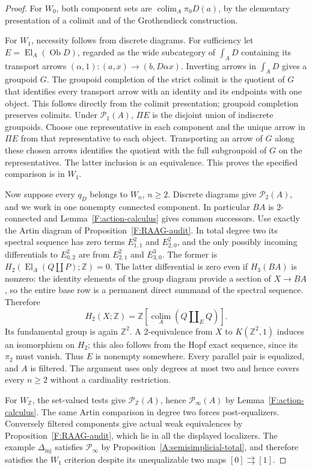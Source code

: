 \documentclass[11pt,a4paper]{article}
\theoremstyle{definition}
\theoremstyle{remark}
\newcommand{\El}{\operatorname{El}}
\newcommand{\colim}{\operatorname*{colim}}
\begin{document}
\begin{proof}
For $W_0$, both component sets are
$\colim_A\pi_0D(a)$, by the elementary presentation of a colimit
and of the Grothendieck construction.

For $W_1$, necessity follows from discrete diagrams.  For sufficiency
let $E=\El_A(\operatorname{Ob}D)$, regarded as the wide subcategory
of $\int_A D$ containing its transport arrows
$(\alpha,1): (a,x)\to(b,D\alpha x)$.
Inverting arrows in $\int_A D$ gives a groupoid $G$.
The groupoid completion of the strict colimit is the quotient of
$G$ that identifies every transport arrow with an identity and its
endpoints with one object.  This follows directly from the colimit
presentation; groupoid completion preserves colimits.
Under $\mathcal P_1(A)$, $\Pi E$ is the disjoint union of
indiscrete groupoids.  Choose one representative in each component
and the unique arrow in $\Pi E$ from that representative to each
object.  Transporting an arrow of $G$ along these chosen arrows
identifies the quotient with the full subgroupoid of $G$ on the
representatives.  The latter inclusion is an equivalence.
This proves the specified comparison is in $W_1$.

Now suppose every $q_D$ belongs to $W_n$, $n\geq2$.
Discrete diagrams give $\mathcal P_2(A)$, and we work in one
nonempty connected component.  In particular $BA$ is $2$-connected
and Lemma~\ref{F:action-calculus} gives common successors.
Use exactly the Artin diagram of Proposition~\ref{F:RAAG-audit}.
In total degree two its spectral sequence has zero terms
$E^2_{1,1}$ and $E^2_{2,0}$, and the only possibly incoming
differentials to $E^2_{0,2}$ are from $E^2_{2,1}$ and $E^3_{3,0}$.
The former is
$H_2(\El_A(Q\amalg P);\mathbb Z)=0$.
The latter differential is zero even if $H_3(BA)$ is nonzero:
the identity elements of the group diagram provide a section of
$X\to BA$, so the entire base row is a permanent direct summand
of the spectral sequence.  Therefore
\[
 H_2(X;\mathbb Z)=\mathbb Z[\colim_A(Q\amalg_E Q)].
\]
Its fundamental group is again $\mathbb Z^2$.
A $2$-equivalence from $X$ to $K(\mathbb Z^2,1)$ induces an
isomorphism on $H_2$; this also follows from the Hopf exact sequence,
since its $\pi_2$ must vanish.  Thus $E$ is nonempty somewhere.
Every parallel pair is equalized, and $A$ is filtered.
The argument uses only degrees at most two and hence covers every
$n\geq2$ without a cardinality restriction.

For $W_{\mathbb Z}$, the set-valued tests give
$\mathcal P_{\mathbb Z}(A)$, hence $\mathcal P_\infty(A)$ by
Lemma~\ref{F:action-calculus}.  The same Artin comparison in
degree two forces post-equalizers.  Conversely filtered components
give actual weak equivalences by Proposition~\ref{F:RAAG-audit},
which lie in all the displayed localizers.
The example $\Delta_{\mathrm{inj}}$ satisfies
$\mathcal P_\infty$ by Proposition~\ref{A:semisimplicial-total}, and therefore
satisfies the $W_1$ criterion despite its unequalizable two maps
$[0]\rightrightarrows[1]$.
\end{proof}
\end{document}
